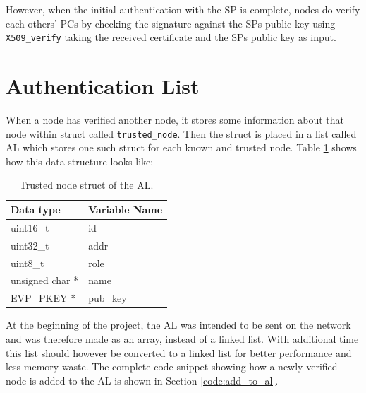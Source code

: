 However, when the initial authentication with the SP is complete, nodes do
verify each others' PCs by checking the signature against the SPs public key
using \texttt{X509\_verify} taking the received certificate and the SPs public
key as input.

\section{Authentication List}
When a node has verified another node, it stores some information about that
node within struct called \texttt{trusted\_node}. Then the struct is placed in a
list called \ac{AL} which stores one such struct for each known and trusted
node. Table \ref{tab:impl_al_content} shows how this data structure looks like:
\begin{table}[h]
	\centering
	\begin{tabular}{| l | l |}\hline
 		\textbf{Data type} & \textbf{Variable Name}\\\hline
		uint16\_t & id\\\hline
		uint32\_t & addr\\\hline
		uint8\_t & role\\\hline 
		unsigned char * & name\\\hline 
		EVP\_PKEY * & pub\_key\\\hline  
	\end{tabular}
	\caption{Trusted node struct of the AL.}
	\label{tab:impl_al_content}
\end{table}
At the beginning of the project, the AL was intended to be sent on the network
and was therefore made as an array, instead of a linked list. With additional
time this list should however be converted to a linked list for better
performance and less memory waste. The complete code snippet showing how a newly
verified node is added to the AL is shown in Section \ref{code:add_to_al}.

